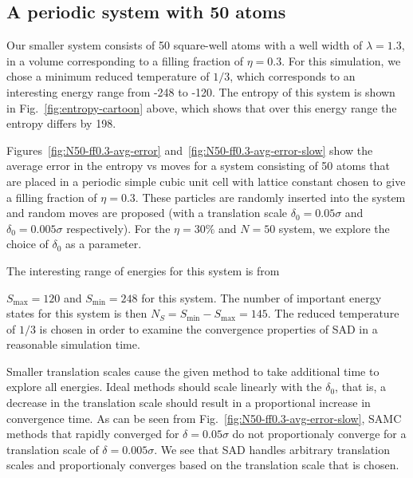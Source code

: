 \documentclass[letterpaper,twocolumn,amsmath,amssymb,pre,aps,10pt]{revtex4-1}
\begin{document}
\subsection{A periodic system with 50 atoms}

Our smaller system consists of 50 square-well atoms with a well width
of $\lambda=1.3$, in a volume corresponding to a filling fraction of
$\eta=0.3$.  For this simulation, we chose a minimum reduced
temperature of $1/3$, which corresponds to an interesting energy range
from -248 to -120.  The entropy of this system is shown in
Fig.~\ref{fig:entropy-cartoon} above, which shows that over this
energy range the entropy differs by 198.

Figures~\ref{fig:N50-ff0.3-avg-error}
and~\ref{fig:N50-ff0.3-avg-error-slow} show the average error in the entropy vs
moves for a system consisting of 50 atoms that are placed in a periodic
simple cubic unit cell with lattice constant chosen to give a filling
fraction of $\eta = 0.3$.  These particles are randomly inserted into
the system and random moves are proposed (with a translation scale
$\delta_0 = 0.05\sigma$ and $\delta_0 = 0.005\sigma$ respectively). For
the $\eta = 30\%$ and $N = 50$ system, we explore the choice of
$\delta_0$ as a parameter.

The interesting range of energies for this system is from
{\color{blue}
$S_{\max} = 120$ and $S_{\min} = 248$ for this system.  The number of
important energy states for this system is then $N_S = S_{\min} - S_{\max} = 145$.
The reduced temperature of $1/3$ is chosen in order to examine the convergence
properties of SAD in a reasonable simulation time.

}

Smaller translation
scales cause the given method to take additional time to explore all
energies. Ideal methods should scale linearly with the $\delta_0$, that
is, a decrease in the translation scale should result in a proportional
increase in convergence time. As can be seen from
Fig.~\ref{fig:N50-ff0.3-avg-error-slow}, SAMC methods that rapidly
converged for $\delta = 0.05\sigma$ do not proportionaly converge for a
translation scale of $\delta = 0.005\sigma$. We see that SAD handles
arbitrary translation scales and proportionaly converges based on the
translation scale that is chosen.
\end{document}
